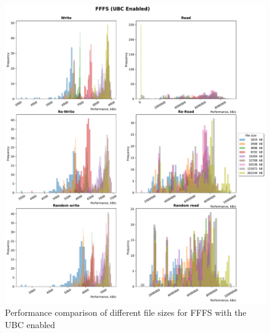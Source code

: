 \begin{figure}[!htb]
	\label{fig:bench_fffs_with_cache}
	\begin{center}
		\includegraphics[width=1.0\textwidth]{figures.nosync/benchmarking/FFFS/FFFS-UBC Enabled-hist.pdf}
	\end{center}
	\caption[Performance comparison for FFFS with the UBC enabled]{Performance comparison of different file sizes for FFFS with the UBC enabled}
\end{figure}
\clearpage
